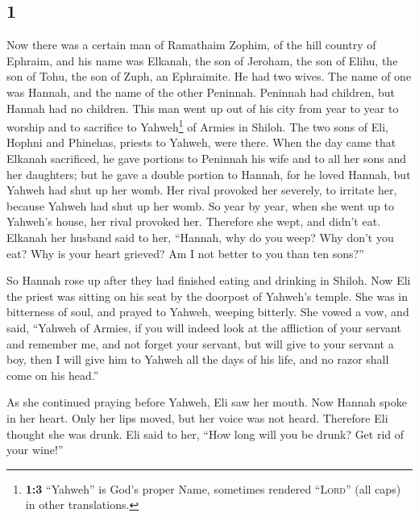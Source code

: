 \begin{paracol}{2}
\switchcolumn
\begin{otherlanguage}{english}

\hypertarget{section-1}{%
\section{1}\label{section-1}}

 Now there was a certain man of Ramathaim Zophim, of the
hill country of Ephraim, and his name was Elkanah, the son of Jeroham,
the son of Elihu, the son of Tohu, the son of Zuph, an Ephraimite.
 He had two wives. The name of one was Hannah, and the
name of the other Peninnah. Peninnah had children, but Hannah had no
children.  This man went up out of his city from year to
year to worship and to sacrifice to Yahweh\footnote{\textbf{1:3}
  ``Yahweh'' is God's proper Name, sometimes rendered ``\textsc{Lord}''
  (all caps) in other translations.} of Armies in Shiloh. The two sons
of Eli, Hophni and Phinehas, priests to Yahweh, were there.
 When the day came that Elkanah sacrificed, he gave
portions to Peninnah his wife and to all her sons and her daughters;
 but he gave a double portion to Hannah, for he loved
Hannah, but Yahweh had shut up her womb.  Her rival
provoked her severely, to irritate her, because Yahweh had shut up her
womb.  So year by year, when she went up to Yahweh's
house, her rival provoked her. Therefore she wept, and didn't eat.
 Elkanah her husband said to her, ``Hannah, why do you
weep? Why don't you eat? Why is your heart grieved? Am I not better to
you than ten sons?''

 So Hannah rose up after they had finished eating and
drinking in Shiloh. Now Eli the priest was sitting on his seat by the
doorpost of Yahweh's temple.  She was in bitterness of
soul, and prayed to Yahweh, weeping bitterly.  She vowed
a vow, and said, ``Yahweh of Armies, if you will indeed look at the
affliction of your servant and remember me, and not forget your servant,
but will give to your servant a boy, then I will give him to Yahweh all
the days of his life, and no razor shall come on his head.''

 As she continued praying before Yahweh, Eli saw her
mouth.  Now Hannah spoke in her heart. Only her lips
moved, but her voice was not heard. Therefore Eli thought she was drunk.
 Eli said to her, ``How long will you be drunk? Get rid
of your wine!''


\end{otherlanguage}
\end{paracol}
